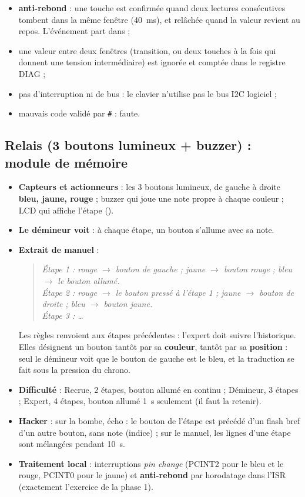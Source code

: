 \documentclass[11pt,a4paper]{article}
\newcommand{\code}[1]{\texttt{\detokenize{#1}}}
\newenvironment{manuel}{\begin{quote}\itshape}{\end{quote}}
\begin{document}
\begin{itemize}
\begin{itemize}
    \item \textbf{anti-rebond} : une touche est confirmée quand deux lectures consécutives tombent dans la même fenêtre (40~ms), et relâchée quand la valeur revient au repos. L'événement part dans \code{qEvents} ;
    \item une valeur entre deux fenêtres (transition, ou deux touches à la fois qui donnent une tension intermédiaire) est ignorée et comptée dans le registre DIAG ;
    \item pas d'interruption ni de bus : le clavier n'utilise pas le bus I2C logiciel ;
    \item mauvais code validé par \texttt{\#} : faute.
  \end{itemize}
\end{itemize}

\subsection{Relais (3 boutons lumineux + buzzer) : module de mémoire}
\label{sec:relais}

\begin{itemize}
  \item \textbf{Capteurs et actionneurs} : les 3 boutons lumineux, de gauche à droite \textbf{bleu, jaune, rouge} ; buzzer qui joue une note propre à chaque couleur ; LCD qui affiche l'étape (\code{ETAPE 2/3}).
  \item \textbf{Le démineur voit} : à chaque étape, un bouton s'allume avec sa note.
  \item \textbf{Extrait de manuel} :
  \begin{manuel}
    Étape 1 : rouge $\to$ bouton de gauche ; jaune $\to$ bouton rouge ; bleu $\to$ le bouton allumé.\\
    Étape 2 : rouge $\to$ le bouton pressé à l'étape 1 ; jaune $\to$ bouton de droite ; bleu $\to$ bouton jaune.\\
    Étape 3 : …
  \end{manuel}
  Les règles renvoient aux étapes précédentes : l'expert doit suivre l'historique. Elles désignent un bouton tantôt par sa \textbf{couleur}, tantôt par sa \textbf{position} : seul le démineur voit que le bouton de gauche est le bleu, et la traduction se fait sous la pression du chrono.
  \item \textbf{Difficulté} : Recrue, 2 étapes, bouton allumé en continu ; Démineur, 3 étapes ; Expert, 4 étapes, bouton allumé 1~s seulement (il faut la retenir).
  \item \textbf{Hacker} : sur la bombe, \og écho\fg{} : le bouton de l'étape est précédé d'un flash bref d'un autre bouton, sans note (indice) ; sur le manuel, les lignes d'une étape sont mélangées pendant 10~s.
  \item \textbf{Traitement local} : interruptions \emph{pin change} (PCINT2 pour le bleu et le rouge, PCINT0 pour le jaune) et \textbf{anti-rebond} par horodatage dans l'ISR (exactement l'exercice de la phase 1).
\end{itemize}
\end{document}
